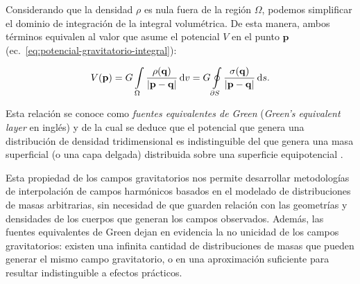 Considerando que la densidad $\rho$ es nula fuera de la región $\Omega$,
podemos simplificar el dominio de integración de la integral volumétrica.
De esta manera, ambos términos equivalen al valor que asume el potencial $V$ en
el punto $\mathbf{p}$ (ec.~\ref{eq:potencial-gravitatorio-integral}):

\begin{equation}
    V(\mathbf{p}) =
    G \int\limits_\Omega
        \frac{\rho(\mathbf{q})}{|\mathbf{p} - \mathbf{q}|}
    \mathop{}\!\textnormal{d} v
    =
    G \oint\limits_{\partial S}
        \frac{\sigma(\mathbf{q})}{|\mathbf{p} - \mathbf{q}|}
    \mathop{}\!\textnormal{d} s.
\end{equation}

Esta relación se conoce como \emph{fuentes equivalentes de Green}
(\emph{Green's equivalent layer} en inglés) y de la cual se deduce que el
potencial que genera una distribución de densidad tridimensional es
indistinguible del que genera una masa superficial (o una capa delgada)
distribuida sobre una superficie equipotencial \citep[][p.~62]{blakely1995}.

Esta propiedad de los campos gravitatorios nos permite desarrollar metodologías
de interpolación de campos harmónicos basados en el modelado de distribuciones
de masas arbitrarias, sin necesidad de que guarden relación con las geometrías
y densidades de los cuerpos que generan los campos observados.
Además, las fuentes equivalentes de Green dejan en evidencia la no unicidad de
los campos gravitatorios: existen una infinita cantidad de distribuciones de
masas que pueden generar el mismo campo gravitatorio, o en una aproximación
suficiente para resultar indistinguible a efectos prácticos.
